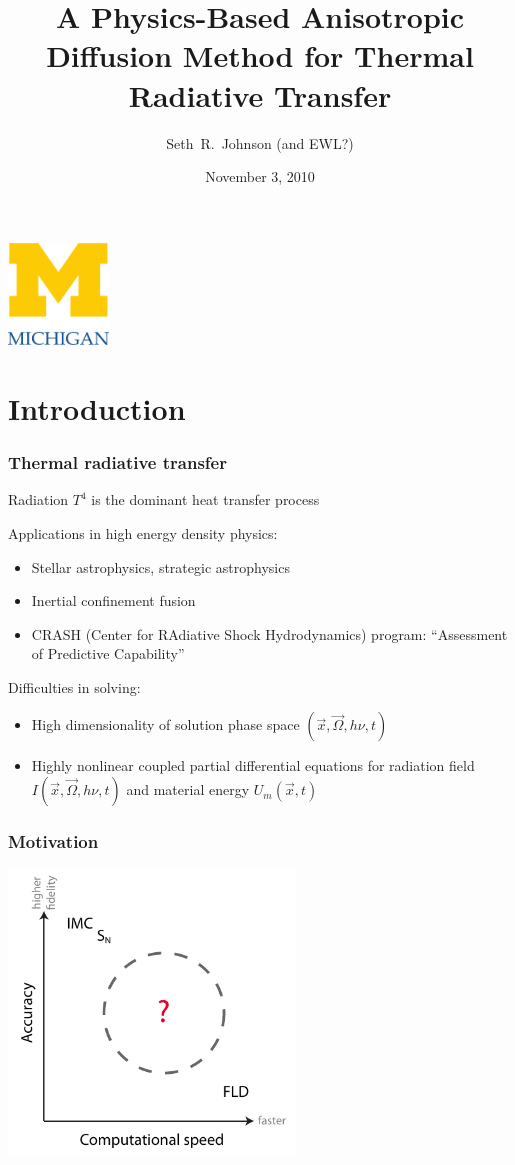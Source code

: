 \documentclass{beamer}
\title[Thesis Prospectus]%
{A Physics-Based Anisotropic Diffusion Method for Thermal Radiative
Transfer}
\author[Seth~R.~Johnson]{Seth~R.~Johnson (and EWL?)}
\institute[UMich]{
University of Michigan, Ann Arbor
}
\date[11/3/2010]{November 3, 2010}
\begin{document}

\begin{frame}
\titlepage
\begin{center}
  \includegraphics[width=0.2\textwidth]{../figures/umlogo}
\end{center}
\end{frame}

\section{Introduction}
\begin{frame}
  \frametitle{Thermal radiative transfer}
  Radiation $T^4$ is the dominant heat transfer process

  Applications in high energy density physics:
  \begin{itemize}
    \item Stellar astrophysics, strategic astrophysics
    \item Inertial confinement fusion
    \item CRASH (Center for RAdiative Shock Hydrodynamics) program: ``Assessment
          of Predictive Capability''
  \end{itemize}
  Difficulties in solving:
  \begin{itemize}
    \item High dimensionality of solution phase space $(\vec{x}, \vec{\Omega},
      h\nu, t)$
    \item Highly nonlinear coupled partial differential equations for radiation
      field $I(\vec{x}, \vec{\Omega}, h\nu, t)$ and material energy $U_m(\vec{x}, t)$
  \end{itemize}
\end{frame}
\begin{frame}
  \frametitle{Motivation}
\begin{center}
  \includegraphics[width=3in]{../figures/fidelity}
\end{center}
\end{frame}
\end{document}
